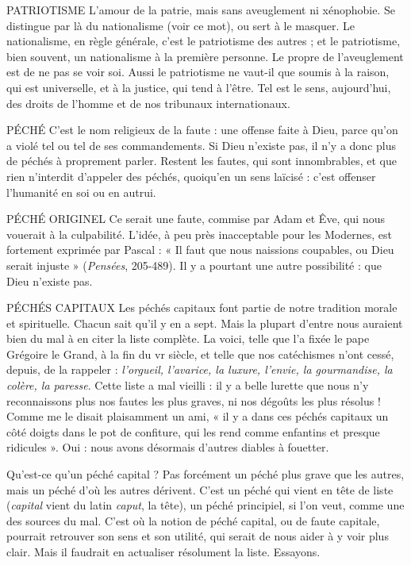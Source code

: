 PATRIOTISME L'amour de la patrie, mais sans aveuglement ni xénophobie.
Se distingue par là du nationalisme (voir ce mot), ou sert à
le masquer. Le nationalisme, en règle générale, c’est le patriotisme des autres ;
et le patriotisme, bien souvent, un nationalisme à la première personne. Le
propre de l’aveuglement est de ne pas se voir soi. Aussi le patriotisme ne vaut-il
que soumis à la raison, qui est universelle, et à la justice, qui tend à l’être. Tel
est le sens, aujourd’hui, des droits de l’homme et de nos tribunaux internationaux.

PÉCHÉ C’est le nom religieux de la faute : une offense faite à Dieu, parce
qu’on a violé tel ou tel de ses commandements. Si Dieu n’existe pas,
il n’y a donc plus de péchés à proprement parler. Restent les fautes, qui sont
innombrables, et que rien n’interdit d’appeler des péchés, quoiqu’en un sens
laïcisé : c’est offenser l'humanité en soi ou en autrui.

PÉCHÉ ORIGINEL Ce serait une faute, commise par Adam et Êve, qui nous
vouerait à la culpabilité. L’idée, à peu près inacceptable
pour les Modernes, est fortement exprimée par Pascal : « Il faut que nous naissions
coupables, ou Dieu serait injuste » ({\it Pensées}, 205-489). Il y a pourtant une
autre possibilité : que Dieu n'existe pas.

PÉCHÉS CAPITAUX Les péchés capitaux font partie de notre tradition morale
et spirituelle. Chacun sait qu’il y en a sept. Mais la
plupart d’entre nous auraient bien du mal à en citer la liste complète. La
voici, telle que l’a fixée le pape Grégoire le Grand, à la fin du vr siècle, et telle
que nos catéchismes n’ont cessé, depuis, de la rappeler : {\it l'orgueil, l'avarice, la
luxure, l'envie, la gourmandise, la colère, la paresse}. Cette liste a mal vieilli : il y a
belle lurette que nous n’y reconnaissons plus nos fautes les plus graves, ni nos
dégoûts les plus résolus ! Comme me le disait plaisamment un ami, « il y a dans
ces péchés capitaux un côté doigts dans le pot de confiture, qui les rend comme
enfantins et presque ridicules ». Oui : nous avons désormais d’autres diables à
fouetter.

Qu'est-ce qu’un péché capital ? Pas forcément un péché plus grave que les
autres, mais un péché d’où les autres dérivent. C’est un péché qui vient en tête
de liste ({\it capital} vient du latin {\it caput}, la tête), un péché principiel, si l’on veut,
comme une des sources du mal. C’est où la notion de péché capital, ou de faute
capitale, pourrait retrouver son sens et son utilité, qui serait de nous aider à y
voir plus clair. Mais il faudrait en actualiser résolument la liste. Essayons.

